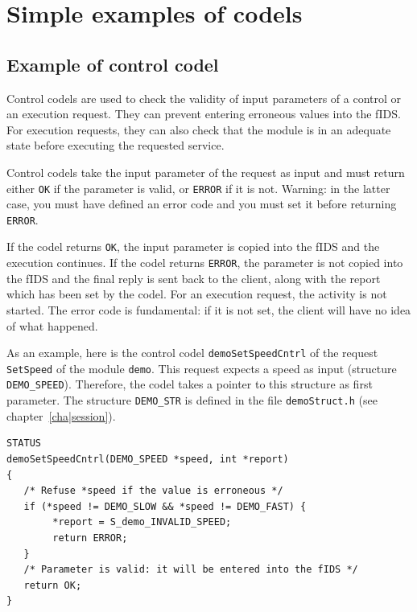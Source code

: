 \section{Simple examples of codels}

\subsection{Example of control codel}
\label{ssec|control|ex}

Control codels are used  to check the  validity of input parameters  of a
control  or  an execution request.    They can prevent entering erroneous
values  into the fIDS. For execution  requests, they can  also check that
the  module  is in   an adequate  state before  executing  the  requested
service.

Control codels take the input parameter of the  request as input and must
return either \texttt{OK} if the parameter is valid, or \texttt{ERROR} if it is
not. Warning: in the latter case, you must have defined an error code and
you must set it before returning \texttt{ERROR}.

If the  codel returns \texttt{OK}, the  input parameter  is copied into the
fIDS and the execution  continues. If the  codel returns \texttt{ERROR}, the
parameter is not copied into the fIDS and the final reply is sent back to
the client, along with the report which has been set by the codel. For an
execution  request,  the  activity is  not  started.   The error code  is
fundamental: if it is  not  set, the client   will have no idea  of  what
happened.

As an example, here  is the control  codel \texttt{demoSetSpeedCntrl} of  the
request \texttt{SetSpeed} of the module \texttt{demo}.  This request expects a
speed as input (structure \texttt{DEMO\_SPEED}).  Therefore, the codel takes
a pointer   to  this structure as  first  parameter.   The structure 
\texttt{DEMO\_STR}  is   defined    in  the    file  \texttt{demoStruct.h}    (see
chapter~\ref{cha|session}).

\begin{center}\begin{cartouche}\small\begin{verbatim}
STATUS
demoSetSpeedCntrl(DEMO_SPEED *speed, int *report)
{
   /* Refuse *speed if the value is erroneous */
   if (*speed != DEMO_SLOW && *speed != DEMO_FAST) {
        *report = S_demo_INVALID_SPEED;
        return ERROR;
   }
   /* Parameter is valid: it will be entered into the fIDS */
   return OK;
}
\end{verbatim}\end{cartouche}\end{center}

